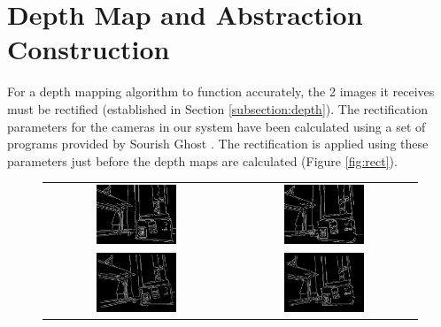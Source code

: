 \section{Depth Map and Abstraction Construction}

For a depth mapping algorithm to function accurately, the 2 images it receives must be rectified (established in Section \ref{subsection:depth}). The rectification parameters for the cameras in our system have been calculated using a set of programs provided by Sourish Ghost \cite{calibgit}. The rectification is applied using these parameters just before the depth maps are calculated (Figure \ref{fig:rect}).

\begin{figure}[H]
    \begin{center}
    \begin{tabular}{ c c }
        \includegraphics[width=0.45\textwidth]{Figures/prerectL.jpg} &
        \includegraphics[width=0.45\textwidth]{Figures/prerectR.jpg} \\
        \includegraphics[width=0.45\textwidth]{Figures/postrectL.jpg} &
        \includegraphics[width=0.45\textwidth]{Figures/postrectR.jpg}

\end{tabular}
\end{center}
\end{figure}

